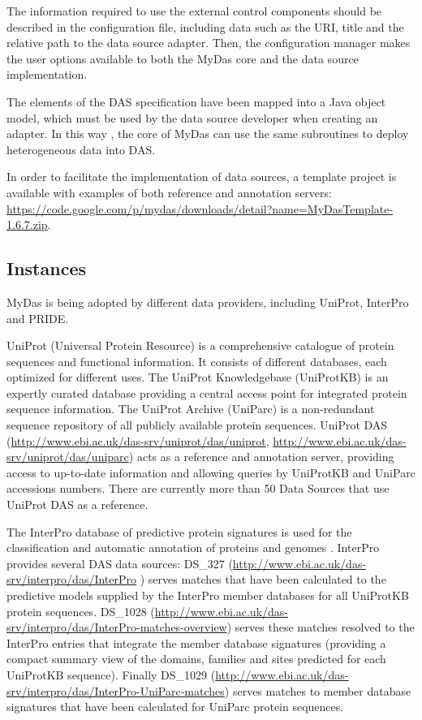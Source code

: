 The information required to use the external control components should be described in the configuration file, including data such as the URI, title and the relative path to the data source adapter. Then, the configuration manager makes the user options available to both the MyDas core and the data source implementation. 

The elements of the DAS specification have been mapped into a Java object model, which must be used by the data source developer when creating an adapter. In this way , the core of MyDas can use the same subroutines to deploy heterogeneous data into DAS. 

In order to facilitate the implementation of data sources, a template project is available with examples of both reference and annotation servers: \url{https://code.google.com/p/mydas/downloads/detail?name=MyDasTemplate-1.6.7.zip}.

\subsection{Instances}
MyDas is being adopted by different data providers, including UniProt, InterPro and PRIDE.

UniProt (Universal Protein Resource)\cite{UNI2011} is a comprehensive catalogue of protein sequences and functional information. It consists of different databases, each optimized for different uses. The UniProt Knowledgebase (UniProtKB) is an expertly curated database providing a central access point for integrated protein sequence information. The UniProt Archive (UniParc) is a non-redundant sequence repository of all publicly available protein sequences. UniProt DAS (\url{http://www.ebi.ac.uk/das-srv/uniprot/das/uniprot}, \url{http://www.ebi.ac.uk/das-srv/uniprot/das/uniparc}) acts as a reference and annotation server, providing access to up-to-date information and allowing queries by UniProtKB and UniParc accessions numbers. There are currently more than 50 Data Sources that use UniProt DAS as a reference.

The InterPro database of predictive protein signatures is used for the classification and automatic annotation of proteins and genomes \cite{HUN2009}. InterPro provides several DAS data sources: DS\_327 (\url{http://www.ebi.ac.uk/das-srv/interpro/das/InterPro} ) serves matches that have been calculated to the predictive models supplied by the InterPro member databases for all UniProtKB protein sequences.  DS\_1028 (\url{http://www.ebi.ac.uk/das-srv/interpro/das/InterPro-matches-overview}) serves these matches resolved to the InterPro entries that integrate the member database signatures (providing a compact summary view of the domains, families and sites predicted for each UniProtKB sequence). Finally DS\_1029 (\url{http://www.ebi.ac.uk/das-srv/interpro/das/InterPro-UniParc-matches}) serves matches to member database signatures that have been calculated for UniParc protein sequences.


